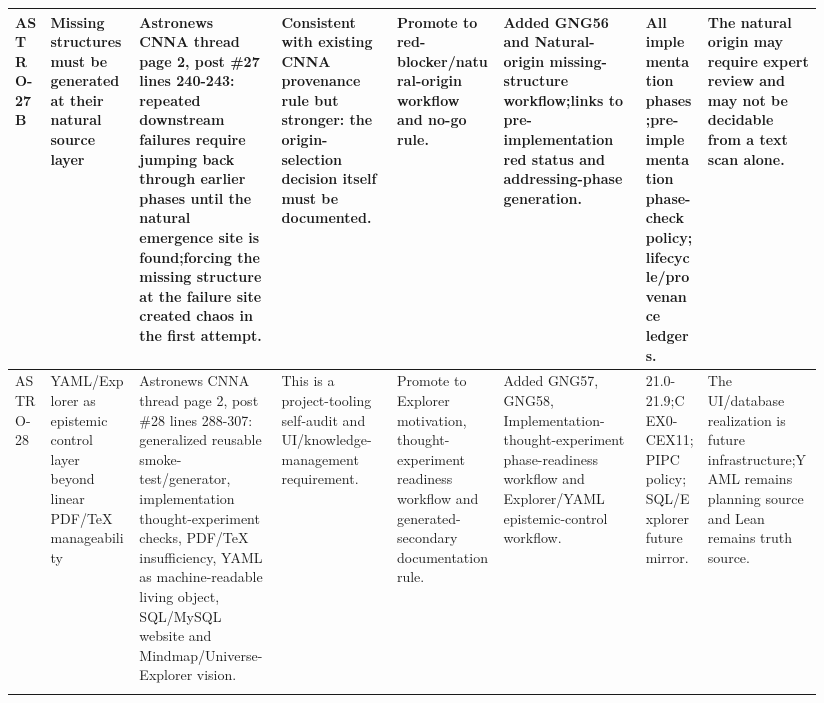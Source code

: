 \begin{longtable}{L{0.04\linewidth} L{0.105\linewidth} L{0.16\linewidth} L{0.13\linewidth} L{0.125\linewidth} L{0.165\linewidth} L{0.075\linewidth} L{0.135\linewidth}}
\hline
\addlinespace[0.24em]
ASTRO-27B & Missing structures must be generated at their natural source layer & Astronews CNNA thread page 2, post \#27 lines 240-243: repeated downstream failures require jumping back through earlier phases until the natural emergence site is found;\newline forcing the missing structure at the failure site created chaos in the first attempt. & Consistent with existing CNNA provenance rule but stronger: the origin-selection decision itself must be documented. & Promote to red-blocker/\allowbreak{}natural-origin workflow and no-go rule. & Added GNG56 and Natural-origin missing-structure workflow;\newline links to pre-implementation red status and addressing-phase generation. & All implementation phases;\newline pre-implementation phase-check policy;\newline lifecycle/\allowbreak{}provenance ledgers. & The natural origin may require expert review and may not be decidable from a text scan alone.\\
\hline
\addlinespace[0.24em]
ASTRO-28 & YAML/\allowbreak{}Explorer as epistemic control layer beyond linear PDF/\allowbreak{}TeX manageability & Astronews CNNA thread page 2, post \#28 lines 288-307: generalized reusable smoke-test/\allowbreak{}generator, implementation thought-experiment checks, PDF/\allowbreak{}TeX insufficiency, YAML as machine-readable living object, SQL/\allowbreak{}MySQL website and Mindmap/\allowbreak{}Universe-Explorer vision. & This is a project-tooling self-audit and UI/\allowbreak{}knowledge-management requirement. & Promote to Explorer motivation, thought-experiment readiness workflow and generated-secondary documentation rule. & Added GNG57, GNG58, Implementation-thought-experiment phase-readiness workflow and Explorer/\allowbreak{}YAML epistemic-control workflow. & 21.0-21.9;\newline CEX0-CEX11;\newline PIPC policy;\newline SQL/\allowbreak{}Explorer future mirror. & The UI/\allowbreak{}database realization is future infrastructure;\newline YAML remains planning source and Lean remains truth source.\\
\hline
\addlinespace[0.24em]

\end{longtable}
